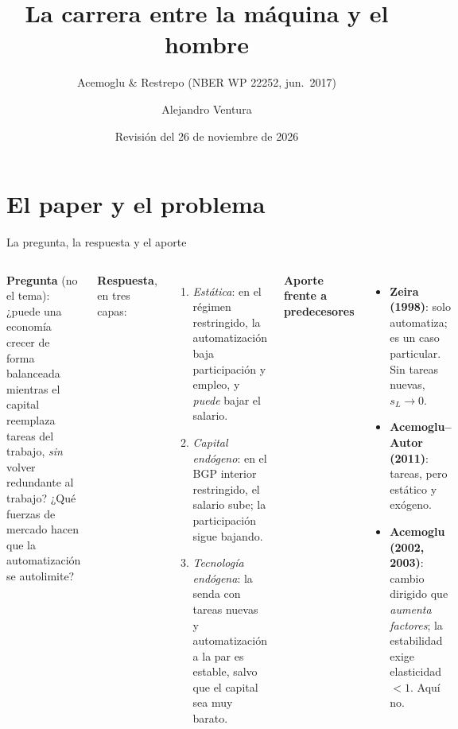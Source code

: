 \documentclass[aspectratio=169,10pt]{beamer}
\title{La carrera entre la máquina y el hombre}
\subtitle{Acemoglu \& Restrepo (NBER WP 22252, jun.\ 2017)}
\author{Alejandro Ventura}
\institute{IA y Modelamiento Económico — UP 2026-II\\ \href{\repourl}{GitHub: ai-06-restrepo}}
\date{Revisión del 26 de noviembre de 2026}
\begin{document}
\maketitle

\section{El paper y el problema}

\begin{frame}{La pregunta, la respuesta y el aporte}
\small
\begin{columns}[T]
\textbf{Pregunta} (no el tema): ¿puede una economía crecer de forma balanceada mientras el capital reemplaza
tareas del trabajo, \emph{sin} volver redundante al trabajo? ¿Qué fuerzas de mercado hacen que la automatización se autolimite?

\medskip
\textbf{Respuesta}, en tres capas:
\begin{enumerate}\setlength\itemsep{2pt}
  \item \emph{Estática}: en el régimen restringido, la automatización baja participación y empleo, y \emph{puede} bajar el salario.
  \item \emph{Capital endógeno}: en el BGP interior restringido, el salario sube; la participación sigue bajando.
  \item \emph{Tecnología endógena}: la senda con tareas nuevas y automatización a la par es estable, salvo que el capital sea muy barato.
\end{enumerate}
\textbf{Aporte frente a predecesores}
\begin{itemize}\setlength\itemsep{2pt}
  \item \textbf{Zeira (1998)}: solo automatiza; es un caso particular. Sin tareas nuevas, $s_L\to0$.
  \item \textbf{Acemoglu--Autor (2011)}: tareas, pero estático y exógeno.
  \item \textbf{Acemoglu (2002, 2003)}: cambio dirigido que \emph{aumenta factores}; la estabilidad exige elasticidad $<1$. Aquí no.
\end{itemize}
\end{columns}
\end{frame}
\end{document}
